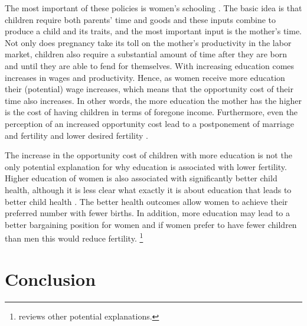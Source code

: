 \documentclass[letterpaper,12pt]{article}
\begin{document}
The most important of these policies is women's schooling \citep{schultz02}.
The basic idea is that children require both parents' time and goods 
and these inputs combine to produce a child and its traits, and the
most important input is the mother's time.
Not only does pregnancy take its toll on the mother's productivity in the 
labor market, children also require a substantial amount of 
time after they are born and until they are able to fend for themselves. 
With increasing education comes increases in wages and productivity.
Hence, as women receive more education their (potential) wage increases,
which means that the opportunity cost of their time also increases.
In other words, the more education the mother has the higher is the cost 
of having children in terms of foregone income.
Furthermore, even the perception of an increased opportunity cost
lead to a postponement of marriage and fertility and lower desired 
fertility \citep{Jensen2012}.

The increase in the opportunity cost of children with more education
is not the only potential explanation for why education is associated
with lower fertility. 
Higher education of women is also associated with significantly better 
child health, although it is less clear what exactly it is about 
education that leads to better child health
\citep{Thomas1991,Glewwe1999,Kovsted2002}.
The better health outcomes allow women to achieve their preferred number
with fewer births.
In addition, more education may lead to a better bargaining position
for women and if women prefer to have fewer children than men this
would reduce fertility.%
\footnote{
\citet{Ainsworth1996} reviews other potential explanations.
}


\section{Conclusion}




\end{document}
